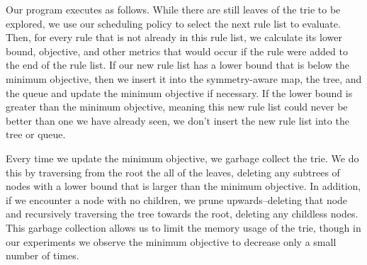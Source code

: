 Our program executes as follows. While there are still leaves of the trie to be explored, we use our scheduling policy to select the next rule list to evaluate. Then, for every rule that is not already in this rule list, we calculate its lower bound, objective, and other metrics that would occur if the rule were added to the end of the rule list. If our new rule list has a lower bound that is below the minimum objective, then we insert it into the symmetry-aware map, the tree, and the queue and update the minimum objective if necessary. If the lower bound is greater than the minimum objective, meaning this new rule list could never be better than one we have already seen, we don't insert the new rule list into the tree or queue. 

Every time we update the minimum objective, we garbage collect the trie. We do this by traversing from the root the all of the leaves, deleting any subtrees of nodes with a lower bound that is larger than the minimum objective. In addition, if we encounter a node with no children, we prune upwards--deleting that node and recursively traversing the tree towards the root, deleting any childless nodes. This garbage collection allows us to limit the memory usage of the trie, though in our experiments we observe the minimum objective to decrease only a small number of times.

